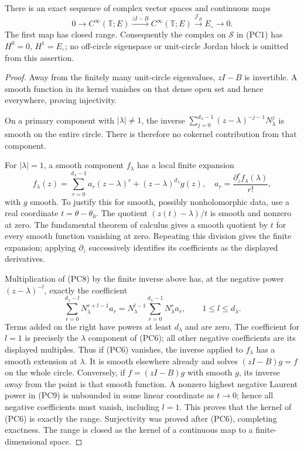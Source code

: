 \begin{theorem}
\label{thm:rapid-prime-cohomology}
There is an exact sequence of complex vector spaces and continuous maps
\[
 0\longrightarrow C^\infty(\mathbb T;E)
 \xrightarrow{zI-B} C^\infty(\mathbb T;E)
 \xrightarrow{\mathcal J_B}E_\circ\longrightarrow0.
 \tag{PC7}
\]
The first map has closed range. Consequently the complex on
$\mathscr S$ in (PC1) has $H^0=0$, $H^1=E_\circ$; no off-circle
eigenspace or unit-circle Jordan block is omitted from this assertion.
\end{theorem}
\begin{proof}
Away from the finitely many unit-circle eigenvalues, $zI-B$ is
invertible. A smooth function in its kernel vanishes on that dense
open set and hence everywhere, proving injectivity.

On a primary component with $|\lambda|\ne1$, the inverse
$\sum_{j=0}^{d_\lambda-1}(z-\lambda)^{-j-1}N_\lambda^j$
is smooth on the entire circle. There is therefore no cokernel
contribution from that component.

For $|\lambda|=1$, a smooth component $f_\lambda$ has a local finite
expansion
\[
 f_\lambda(z)=\sum_{r=0}^{d_\lambda-1}a_r(z-\lambda)^r
           +(z-\lambda)^{d_\lambda}g(z),
 \quad a_r=\frac{\partial_z^rf_\lambda(\lambda)}{r!},
 \tag{PC8}
\]
with $g$ smooth. To justify this for smooth, possibly nonholomorphic
data, use a real coordinate $t=\theta-\theta_0$. The quotient
$(z(t)-\lambda)/t$ is smooth and nonzero at zero. The fundamental
theorem of calculus gives a smooth quotient by $t$ for every smooth
function vanishing at zero. Repeating this division gives the finite
expansion; applying $\partial_z$ successively identifies its
coefficients as the displayed derivatives.

Multiplication of (PC8) by the finite inverse above has, at the
negative power $(z-\lambda)^{-l}$, exactly the coefficient
\[
 \sum_{r=0}^{d_\lambda-l}N_\lambda^{r+l-1}a_r
  =N_\lambda^{l-1}\sum_{r=0}^{d_\lambda-1}N_\lambda^r a_r,
 \qquad 1\le l\le d_\lambda.
 \tag{PC9}
\]
Terms added on the right have powers at least $d_\lambda$ and are
zero. The coefficient for $l=1$ is precisely the $\lambda$ component
of (PC6); all other negative coefficients are its displayed multiples.
Thus if (PC6) vanishes, the inverse applied to $f_\lambda$ has a
smooth extension at $\lambda$. It is smooth elsewhere already and
solves $(zI-B)g=f$ on the whole circle. Conversely, if $f=(zI-B)g$
with smooth $g$, its inverse away from the point is that smooth
function. A nonzero highest negative Laurent power in (PC9) is
unbounded in some linear coordinate as $t\to0$; hence all negative
coefficients must vanish, including $l=1$. This proves that the
kernel of (PC6) is exactly the range. Surjectivity was proved after
(PC6), completing exactness. The range is closed as the kernel of a
continuous map to a finite-dimensional space.
\end{proof}

